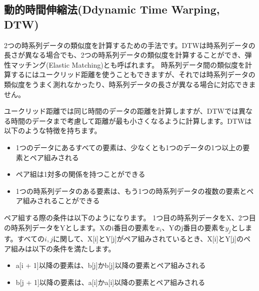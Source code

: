 \documentclass{jlreq}
\begin{document}
\subsection{動的時間伸縮法(Ddynamic Time Warping, DTW)}
2つの時系列データの類似度を計算するための手法です。DTWは時系列データの長さが異なる場合でも、2つの時系列データの類似度を計算することができ、弾性マッチング(Elastic Matching)とも呼ばれます。
時系列データ間の類似度を計算するにはユークリッド距離を使うこともできますが、それでは時系列データの類似度をうまく測れなかったり、時系列データの長さが異なる場合に対応できません。

\begin{center}
\end{center}

\vspace{0.5cm}

ユークリッド距離では同じ時間のデータの距離を計算しますが、DTWでは異なる時間のデータまで考慮して距離が最も小さくなるように計算します。DTWは以下のような特徴を持ちます。

\begin{itemize}
  \item 1つのデータにあるすべての要素は、少なくとも1つのデータの1つ以上の要素とペア組みされる
  \item ペア組は1対多の関係を持つことができる
  \item 1つの時系列データのある要素は、もう1つの時系列データの複数の要素とペア組みされることができる
\end{itemize}

ペア組する際の条件は以下のようになります。
1つ目の時系列データをX、2つ目の時系列データをYとします。Xのi番目の要素を$x_i$、Yのj番目の要素を$y_j$とします。すべての$i, j$に関して、X[i]とY[j]がペア組みされているとき、X[i]とY[j]のペア組みは以下の条件を満たします。
\begin{itemize}
  \item a[i + 1]以降の要素は、b[j]かb[j]以降の要素とペア組みされる
  \item b[j + 1]以降の要素は、a[i]かa[i]以降の要素とペア組みされる
\end{itemize}
\end{document}

